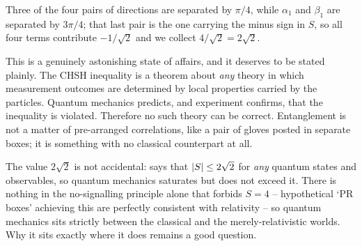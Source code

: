 \documentclass[a4paper]{scrartcl}
\begin{document}
\begin{center}
\end{center}

Three of the four pairs of directions are separated by $\pi/4$, while $\alpha_1$ and $\beta_1$ are separated by $3\pi/4$; that last pair is the one carrying the minus sign in $S$, so all four terms contribute $-1/\sqrt2$ and we collect $4/\sqrt2 = 2\sqrt2$.

This is a genuinely astonishing state of affairs, and it deserves to be stated plainly. The CHSH inequality is a theorem about \emph{any} theory in which measurement outcomes are determined by local properties carried by the particles. Quantum mechanics predicts, and experiment confirms, that the inequality is violated. Therefore no such theory can be correct. Entanglement is not a matter of pre-arranged correlations, like a pair of gloves posted in separate boxes; it is something with no classical counterpart at all.

\begin{remark}
	The value $2\sqrt2$ is not accidental:  says that $\lvert S\rvert\leq 2\sqrt2$ for \emph{any} quantum states and observables, so quantum mechanics saturates but does not exceed it. There is nothing in the no-signalling principle alone that forbids $S = 4$ -- hypothetical `PR boxes' achieving this are perfectly consistent with relativity -- so quantum mechanics sits strictly between the classical and the merely-relativistic worlds. Why it sits exactly where it does remains a good question.
\end{remark}
\end{document}
